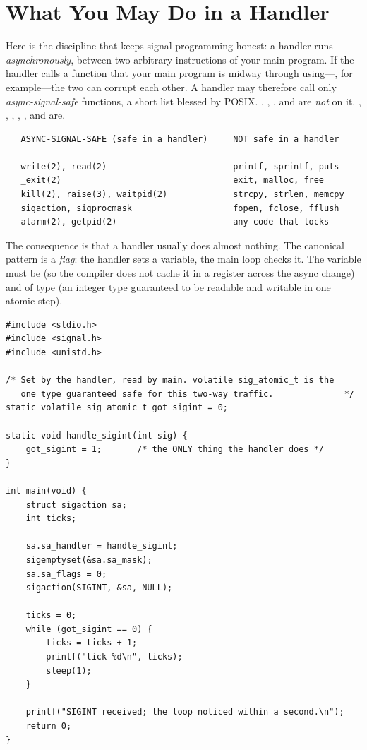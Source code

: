 \section{What You May Do in a Handler}

Here is the discipline that keeps signal programming honest: a handler
runs \emph{asynchronously}, between two arbitrary instructions of your
main program. If the handler calls a function that your main program is
midway through using---, for example---the two can corrupt
each other. A handler may therefore call only \emph{async-signal-safe}
functions, a short list blessed by POSIX. , ,
, and  are \emph{not} on it. ,
, , , , and
 are.

\begin{verbatim}
   ASYNC-SIGNAL-SAFE (safe in a handler)     NOT safe in a handler
   -------------------------------          ----------------------
   write(2), read(2)                         printf, sprintf, puts
   _exit(2)                                  exit, malloc, free
   kill(2), raise(3), waitpid(2)             strcpy, strlen, memcpy
   sigaction, sigprocmask                    fopen, fclose, fflush
   alarm(2), getpid(2)                       any code that locks
\end{verbatim}

The consequence is that a handler usually does almost nothing. The
canonical pattern is a \emph{flag}: the handler sets a variable, the
main loop checks it. The variable must be  (so the
compiler does not cache it in a register across the async change) and
of type  (an integer type guaranteed to be
readable and writable in one atomic step).

\begin{lstlisting}[caption={The flag pattern: handler sets, main loop acts.}]
#include <stdio.h>
#include <signal.h>
#include <unistd.h>

/* Set by the handler, read by main. volatile sig_atomic_t is the
   one type guaranteed safe for this two-way traffic.              */
static volatile sig_atomic_t got_sigint = 0;

static void handle_sigint(int sig) {
    got_sigint = 1;       /* the ONLY thing the handler does */
}

int main(void) {
    struct sigaction sa;
    int ticks;

    sa.sa_handler = handle_sigint;
    sigemptyset(&sa.sa_mask);
    sa.sa_flags = 0;
    sigaction(SIGINT, &sa, NULL);

    ticks = 0;
    while (got_sigint == 0) {
        ticks = ticks + 1;
        printf("tick %d\n", ticks);
        sleep(1);
    }

    printf("SIGINT received; the loop noticed within a second.\n");
    return 0;
}
\end{lstlisting}

